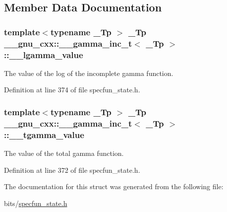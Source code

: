 \subsection{Member Data Documentation}
\subsubsection[{\texorpdfstring{\+\_\+\+\_\+lgamma\+\_\+value}{__lgamma_value}}]{\setlength{\rightskip}{0pt plus 5cm}template$<$typename \+\_\+\+Tp $>$ \+\_\+\+Tp {\bf \+\_\+\+\_\+gnu\+\_\+cxx\+::\+\_\+\+\_\+gamma\+\_\+inc\+\_\+t}$<$ \+\_\+\+Tp $>$\+::\+\_\+\+\_\+lgamma\+\_\+value}\hypertarget{struct____gnu__cxx_1_1____gamma__inc__t_a193b3f7871e371363571fe90b1ce1767}{}\label{struct____gnu__cxx_1_1____gamma__inc__t_a193b3f7871e371363571fe90b1ce1767}


The value of the log of the incomplete gamma function. 



Definition at line 374 of file specfun\+\_\+state.\+h.

\subsubsection[{\texorpdfstring{\+\_\+\+\_\+tgamma\+\_\+value}{__tgamma_value}}]{\setlength{\rightskip}{0pt plus 5cm}template$<$typename \+\_\+\+Tp $>$ \+\_\+\+Tp {\bf \+\_\+\+\_\+gnu\+\_\+cxx\+::\+\_\+\+\_\+gamma\+\_\+inc\+\_\+t}$<$ \+\_\+\+Tp $>$\+::\+\_\+\+\_\+tgamma\+\_\+value}\hypertarget{struct____gnu__cxx_1_1____gamma__inc__t_a53d4ffc984c6685ce328caff424b5fe4}{}\label{struct____gnu__cxx_1_1____gamma__inc__t_a53d4ffc984c6685ce328caff424b5fe4}


The value of the total gamma function. 



Definition at line 372 of file specfun\+\_\+state.\+h.



The documentation for this struct was generated from the following file\+:\begin{DoxyCompactItemize}
\item 
bits/\hyperlink{specfun__state_8h}{specfun\+\_\+state.\+h}\end{DoxyCompactItemize}
